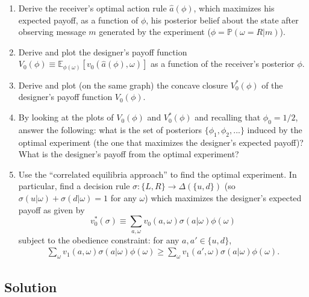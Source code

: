 \documentclass[a4paper]{article}
\newif\ifsolutions
\begin{document}
	\begin{enumerate}
		\item Derive the receiver's optimal action rule $\hat{a}(\phi)$, which maximizes his expected payoff, as a function of $\phi$, his posterior belief about the state after observing message $m$ generated by the experiment ($\phi = \mathbb{P} (\omega=R | m)$).
		\item Derive and plot the designer's payoff function $V_0(\phi) \equiv \mathbb{E}_{\phi(\omega)} \left[v_0 (\hat{a}(\phi), \omega)\right]$ as a function of the receiver's posterior $\phi$.
		\item Derive and plot (on the same graph) the concave closure $V_0^* (\phi)$ of the designer's payoff function $V_0(\phi)$.
		\item By looking at the plots of $V_0(\phi)$ and $V_0^* (\phi)$ and recalling that $\phi_0 = 1/2$, answer the following: what is the set of posteriors $\{\phi_1, \phi_2, ...\}$ induced by the optimal experiment (the one that maximizes the designer's expected payoff)? What is the designer's payoff from the optimal experiment?
		\item Use the ``correlated equilibria approach'' to find the optimal experiment. In particular, find a decision rule $\sigma: \{L,R\} \to \varDelta(\{u,d\})$ (so $\sigma(u|\omega)+\sigma(d|\omega)=1$ for any $\omega$) which maximizes the designer's expected payoff as given by
		\begin{equation*}
			v_0^* (\sigma) \equiv  \sum_{a,\omega} v_0(a,\omega) \sigma (a | \omega) \phi(\omega)
		\end{equation*}
		subject to the obedience constraint: for any $a,a' \in \{u,d\}$,
		\begin{align*}
			\sum_{\omega} v_1 (a, \omega) \sigma (a | \omega) \phi(\omega) 
			\geq \sum_{\omega} v_1 (a', \omega) \sigma (a | \omega) \phi(\omega) .
		\end{align*} 
	\end{enumerate}
	
	
\ifsolutions
\subsection*{Solution}
\end{document}
